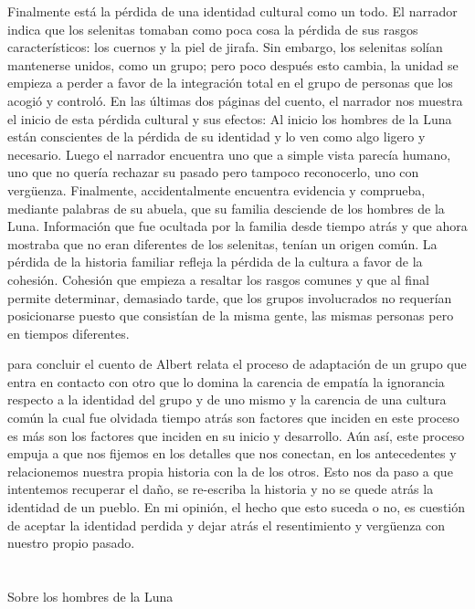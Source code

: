 \documentclass[a3paper]{tufte-handout}
\begin{document}
Finalmente está la pérdida de una identidad cultural como un todo. El narrador indica que los selenitas tomaban como poca cosa la pérdida de sus rasgos característicos: los cuernos y la piel de jirafa. Sin embargo, los selenitas solían mantenerse unidos, como un grupo; pero poco después esto cambia, la unidad se empieza a perder a favor de la integración total en el grupo de personas que los acogió y controló. En las últimas dos páginas del cuento, el narrador nos muestra el inicio de esta pérdida cultural y sus efectos: Al inicio los hombres de la Luna están conscientes de la pérdida de su identidad y lo ven como algo ligero y necesario. Luego el narrador encuentra uno que a simple vista parecía humano, uno que no quería rechazar su pasado pero tampoco reconocerlo, uno con vergüenza. Finalmente, accidentalmente encuentra evidencia y comprueba, mediante palabras de su abuela, que su familia desciende de los hombres de la Luna. Información que fue ocultada por la familia desde tiempo atrás y que ahora mostraba que no eran diferentes de los selenitas, tenían un origen común. La pérdida de la historia familiar refleja la pérdida de la cultura a favor de la cohesión. Cohesión que empieza a resaltar los rasgos comunes y que al final permite determinar, demasiado tarde, que los grupos involucrados no requerían posicionarse puesto que consistían de la misma gente, las mismas personas pero en tiempos diferentes.


\noindent
para concluir el cuento de Albert relata el proceso de adaptación de un grupo que entra en contacto con otro que lo domina la carencia de empatía la ignorancia respecto a la identidad del grupo y de uno mismo y la carencia de una cultura común la cual fue olvidada tiempo atrás son factores que inciden en este proceso es más son los factores que inciden en su inicio y desarrollo. Aún así, este proceso empuja a que nos fijemos en los detalles que nos conectan, en los antecedentes y relacionemos nuestra propia historia con la de los otros. Esto nos da paso a que intentemos recuperar el daño, se re-escriba la historia y no se quede atrás la identidad de un pueblo. En mi opinión, el hecho que esto suceda o no, es cuestión de aceptar la identidad perdida y dejar atrás el resentimiento y vergüenza con nuestro propio pasado.

\hrulefill

\section*{}{Sobre los hombres de la Luna}
\end{document}
